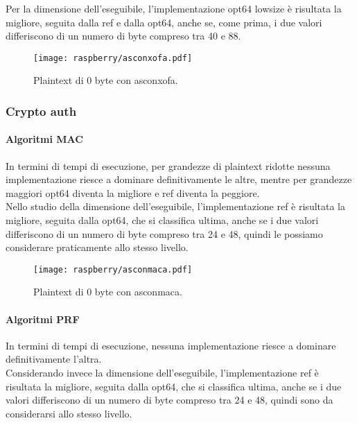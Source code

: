 \noindent Per la dimensione dell'eseguibile, l'implementazione opt64 lowsize è risultata la migliore, seguita dalla ref e dalla opt64, anche se, come prima, i due valori differiscono di un numero di byte compreso tra 40 e 88.

\begin{figure}[H]
    \centering
    \texttt{[image: raspberry/asconxofa.pdf]}
    \caption{Plaintext di 0 byte con asconxofa.}
\end{figure}

\subsubsection{Crypto auth}

\paragraph{Algoritmi MAC}

In termini di tempi di esecuzione, per grandezze di plaintext ridotte nessuna implementazione riesce a dominare definitivamente le altre, mentre per grandezze maggiori opt64 diventa la migliore e ref diventa la peggiore. \\

\noindent Nello studio della dimensione dell'eseguibile, l'implementazione ref è risultata la migliore, seguita dalla opt64, che si classifica ultima, anche se i due valori differiscono di un numero di byte compreso tra 24 e 48, quindi le possiamo considerare praticamente allo stesso livello.

\begin{figure}[H]
    \centering
    \texttt{[image: raspberry/asconmaca.pdf]}
    \caption{Plaintext di 0 byte con asconmaca.}
\end{figure}

\paragraph{Algoritmi PRF}

In termini di tempi di esecuzione, nessuna implementazione riesce a dominare definitivamente l'altra. \\

\noindent Considerando invece la dimensione dell'eseguibile, l'implementazione ref  è risultata la migliore, seguita dalla opt64, che si classifica ultima, anche se i due valori differiscono di un numero di byte compreso tra 24 e 48, quindi sono da considerarsi allo stesso livello.

